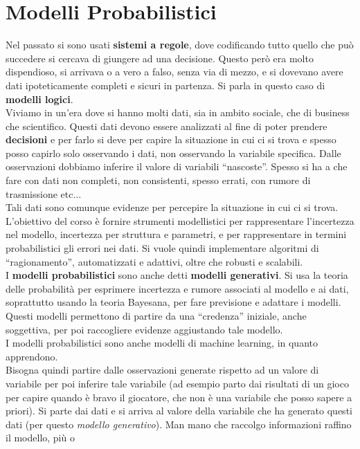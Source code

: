 \message{ !name(modprob.tex)}\documentclass[a4paper,12pt, oneside]{book}
\begin{document}
\chapter{Modelli Probabilistici}
Nel passato si sono usati \textbf{sistemi a regole}, dove codificando tutto
quello che può succedere si cercava di giungere ad una decisione. Questo però
era molto dispendioso, si arrivava o a vero a falso, senza via di mezzo, e si
dovevano avere dati ipoteticamente completi e sicuri in partenza. Si parla in
questo caso di \textbf{modelli logici}.\\
Viviamo in un'era dove si hanno molti dati, sia in ambito sociale, che di
business che scientifico. Questi dati devono essere analizzati al fine di poter
prendere \textbf{decisioni} e per farlo si deve per capire la situazione in cui
ci si trova e spesso posso capirlo solo osservando i dati, non osservando la
variabile specifica. Dalle osservazioni dobbiamo inferire il valore di variabili
``nascoste''. Spesso si ha a che fare con dati non completi, non consistenti,
spesso errati, con rumore di trasmissione etc$\ldots$\\
Tali dati sono comunque
evidenze per percepire la situazione in cui ci si trova. L'obiettivo del corso è
fornire strumenti modellistici per rappresentare l'incertezza nel modello,
incertezza per struttura e parametri, e per rappresentare in termini
probabilistici gli errori nei dati. Si vuole quindi implementare algoritmi di
``ragionamento'', automatizzati e adattivi, oltre che robusti e scalabili.\\
I \textbf{modelli probabilistici} sono anche detti \textbf{modelli
  generativi}. Si usa la teoria delle probabilità per esprimere incertezza e
rumore associati al modello e ai dati, soprattutto usando la teoria Bayesana,
per fare previsione e adattare i modelli. Questi modelli permettono di partire
da una ``credenza'' iniziale, anche soggettiva, per poi raccogliere evidenze
aggiustando tale modello.\\
I modelli probabilistici sono anche modelli di machine learning, in quanto
apprendono.\\
Bisogna quindi partire dalle osservazioni generate rispetto ad un valore di
variabile per poi inferire tale variabile (ad esempio parto dai risultati di un
gioco per capire quando è bravo il giocatore, che non è una variabile che posso
sapere a priori). Si parte dai dati e si arriva al
valore della variabile che ha generato questi dati (per questo \textit{modello
  generativo}). Man mano che raccolgo informazioni raffino il modello, più o
\end{document}
